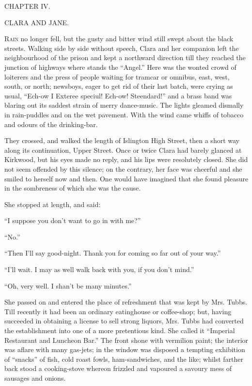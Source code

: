{}

{CHAPTER IV.}

CLARA AND JANE.

\textsc{Rain} no longer fell, but the gusty and bitter wind still swept
about the black streets. Walking side by side without speech, Clara and
her companion left the neighbourhood of the prison and kept a northward
direction till they reached the junction of highways where stands the
``Angel.'' Here was the wonted crowd of loiterers and the press of
people waiting for tramcar or omnibus, east, west, south, or north;
newsboys, eager to get rid of their last batch, were crying as usual,
``Ech-ow I Exteree speciul! Ech-ow! Steendard!'' and a brass band was
blaring out its saddest strain of merry dance-music. The lights gleamed
dismally in rain-puddles and on the wet pavement. With the wind {}came
whiffs of tobacco and odours of the drinking-bar.

They crossed, and walked the length of Islington High Street, then a
short way along its continuation, Upper Street. Once or twice Clara had
barely glanced at Kirkwood, but his eyes made no reply, and his lips
were resolutely closed. She did not seem offended by this silence; on
the contrary, her face was cheerful and she smiled to herself now and
then. One would have imagined that she found pleasure in the sombreness
of which she was the cause.

She stopped at length, and said:

``I suppose you don't want to go in with me?''

``No.''

``Then I'll say good-night. Thank you for coming so far out of your
way.''

``I'll wait. I may as well walk back with you, if you don't mind.''

``Oh, very well. I shan't be many minutes.''

She passed on and entered the place of {}refreshment that was kept by
Mrs. Tubbs. Till recently it had been an ordinary eatinghouse or
coffee-shop; but, having succeeded in obtaining a license to sell strong
liquors, Mrs. Tubbs had converted the establishment into one of a more
pretentious kind. She called it ``Imperial Restaurant and Luncheon
Bar.'' The front shone with vermilion paint; the interior was aflare
with many gas-jets; in the window was disposed a tempting exhibition of
``snacks'' of fish, cold roast fowls, ham-sandwiches, and the like;
whilst farther back stood a cooking-stove whereon frizzled and vapoured
a savoury mess of sausages and onions.

